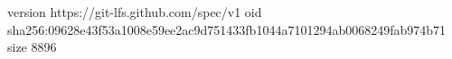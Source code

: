 version https://git-lfs.github.com/spec/v1
oid sha256:09628e43f53a1008e59ee2ac9d751433fb1044a7101294ab0068249fab974b71
size 8896
